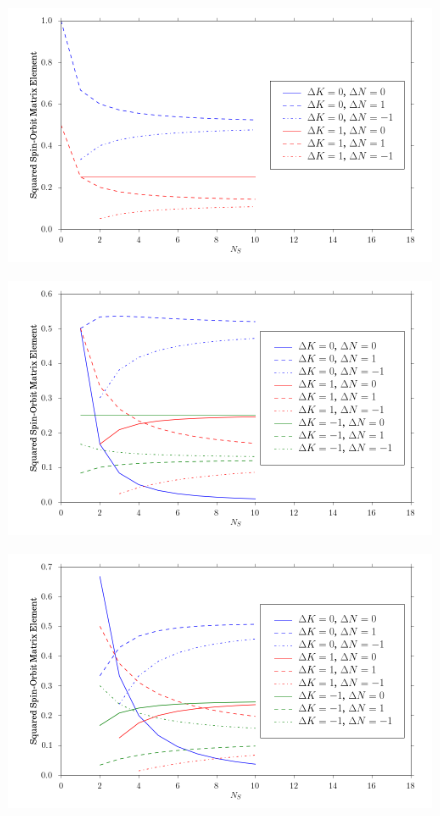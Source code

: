 \documentclass[12pt,draft]{mitthesis}
\begin{document}
\begin{figure}
  \caption{}
  \label{fig:rotational-factors-0}
  \centering
  \includegraphics[width=6in]{rotational_factors_k0.png}
\end{figure}

\begin{figure}
  \caption{}
  \label{fig:rotational-factors-1}
  \centering
  \includegraphics[width=6in]{rotational_factors_k1.png}
\end{figure}

\begin{figure}
  \caption{}
  \label{fig:rotational-factors-2}
  \centering
  \includegraphics[width=6in]{rotational_factors_k2.png}
\end{figure}
\end{document}

